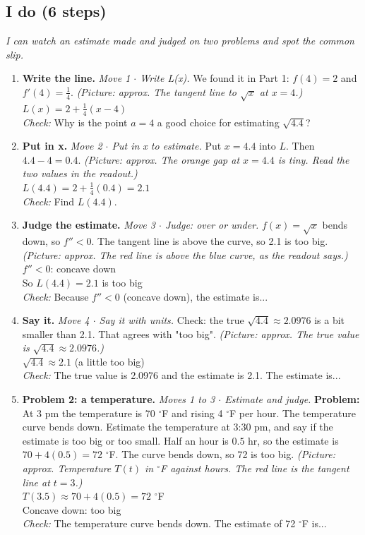 \documentclass[11pt]{article}
\begin{document}
\subsection*{I do (6 steps)}
\textit{I can watch an estimate made and judged on two problems and spot the common slip.}\par
\begin{enumerate}
\item \textbf{Write the line.} \textit{Move 1 $\cdot$ Write L(x).} We found it in Part 1: $f(4)=2$ and $f'(4)=\tfrac14$. \textit{(Picture: approx. The tangent line to $\sqrt{x}$ at $x=4$.)}\\ $L(x)=2+\tfrac14(x-4)$\\ \textit{Check:} Why is the point $a=4$ a good choice for estimating $\sqrt{4.4}$? 
\item \textbf{Put in x.} \textit{Move 2 $\cdot$ Put in x to estimate.} Put $x=4.4$ into $L$. Then $4.4-4=0.4$. \textit{(Picture: approx. The orange gap at $x=4.4$ is tiny. Read the two values in the readout.)}\\ $L(4.4)=2+\tfrac14(0.4)=2.1$\\ \textit{Check:} Find $L(4.4)$. 
\item \textbf{Judge the estimate.} \textit{Move 3 $\cdot$ Judge: over or under.} $f(x)=\sqrt{x}$ bends down, so $f''<0$. The tangent line is above the curve, so 2.1 is too big. \textit{(Picture: approx. The red line is above the blue curve, as the readout says.)}\\ $f''<0$: concave down\\ So $L(4.4)=2.1$ is too big\\ \textit{Check:} Because $f''<0$ (concave down), the estimate is... 
\item \textbf{Say it.} \textit{Move 4 $\cdot$ Say it with units.} Check: the true $\sqrt{4.4}\approx2.0976$ is a bit smaller than 2.1. That agrees with "too big". \textit{(Picture: approx. The true value is $\sqrt{4.4}\approx2.0976$.)}\\ $\sqrt{4.4}\approx2.1$ (a little too big)\\ \textit{Check:} The true value is 2.0976 and the estimate is 2.1. The estimate is... 
\item \textbf{Problem 2: a temperature.} \textit{Moves 1 to 3 $\cdot$ Estimate and judge.} \textbf{Problem:} At 3 pm the temperature is 70 $^\circ$F and rising 4 $^\circ$F per hour. The temperature curve bends down. Estimate the temperature at 3:30 pm, and say if the estimate is too big or too small. Half an hour is $0.5$ hr, so the estimate is $70+4(0.5)=72$ $^\circ$F. The curve bends down, so 72 is too big. \textit{(Picture: approx. Temperature $T(t)$ in $^\circ$F against hours. The red line is the tangent line at $t=3$.)}\\ $T(3.5)\approx70+4(0.5)=72$ $^\circ$F\\ Concave down: too big\\ \textit{Check:} The temperature curve bends down. The estimate of 72 $^\circ$F is... 

\end{enumerate}
\end{document}
